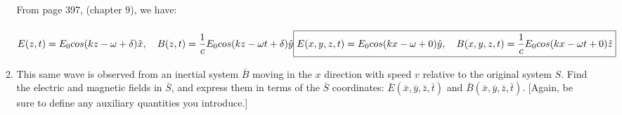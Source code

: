 \documentclass[fleqn]{article}
\begin{document}
\begin{enumerate}
\begin{enumerate}
        \textcolor{hwColor}{
          \\
          From page 397, (chapter 9), we have:
          \\
          \\
          $
            E(z, t)=E_0 cos(kz-\omega+\delta) \hat{x}, ~~~ B(z,t)=\dfrac{1}{c} E_0 cos(kz-\omega t+\delta) \hat{y}
            \\
            \\
            \\
            \boxed{
              E(x,y,z, t)=E_0 cos(kx-\omega+0) \hat{y}, ~~~ B(x,y,z,t)=\dfrac{1}{c} E_0 cos(kx-\omega t+0) \hat{z}
            }
            \\
            \\
          $
        }

      \item This same wave is observed from an inertial system $\bar{B}$ moving in the $x$ direction
      with speed $v$ relative to the original system $S$. Find the electric and magnetic
      fields in $\bar{S}$, and express them in terms of the $\bar{S}$ coordinates:  $\bar{E}(\bar{x}, \bar{y}, \bar{z}, \bar{t})$ and
      $\bar{B}(\bar{x}, \bar{y}, \bar{z}, \bar{t})$. [Again, be sure to define any auxiliary quantities you introduce.]


\end{enumerate}
\end{enumerate}
\end{document}
